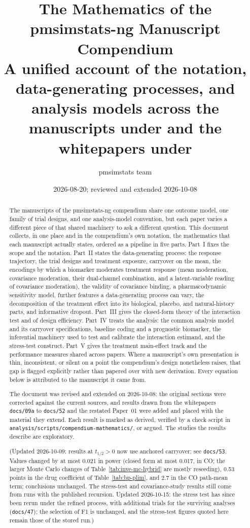 \documentclass[11pt]{article}
\title{\textbf{The Mathematics of the pmsimstats-ng Manuscript
Compendium}\\[0.3em]
\large A unified account of the notation, data-generating processes,
and analysis models across the manuscripts under
\code{analysis/report/} and the whitepapers under \code{docs/}}
\author{pmsimstats team}
\date{2026-08-20; reviewed and extended 2026-10-08}
\newcommand{\code}[1]{\texttt{#1}}
\begin{document}
\maketitle

\begin{abstract}
\noindent
The manuscripts of the pmsimstats-ng compendium share one
outcome model, one family of trial designs, and one analysis-model
convention, but each paper varies a different piece of that shared
machinery to ask a different question. This document collects, in one
place and in the compendium's own notation, the mathematics that each
manuscript actually states, ordered as a pipeline in five parts.
Part~I fixes the scope and the notation. Part~II states the
data-generating process: the response trajectory, the trial designs
and treatment exposure, carryover on the mean, the encodings by which
a biomarker moderates treatment response (mean moderation, covariance
moderation, their dual-channel combination, and a latent-variable
reading of covariance moderation), the validity of covariance binding,
a pharmacodynamic sensitivity model, further features a
data-generating process can vary, the decomposition of the treatment
effect into its biological, placebo, and natural-history parts, and
informative dropout. Part~III gives the closed-form theory of the
interaction test and of design efficiency. Part~IV treats the
analysis: the common analysis model and its carryover specifications,
baseline coding and a prognostic biomarker, the inferential machinery
used to test and calibrate the interaction estimand, and the
stress-test construct. Part~V gives the treatment main-effect track
and the performance measures shared across papers. Where a
manuscript's own presentation is thin, inconsistent, or silent on a
point the compendium's design nonetheless raises, that gap is flagged
explicitly rather than papered over with new derivation. Every
equation below is attributed to the manuscript it came from.

The document was revised and extended on 2026-10-08: the original
sections were corrected against the current sources, and results drawn
from the whitepapers \code{docs/09a} to \code{docs/52} and the restated
Paper~01 were added and placed with the material they extend. Each
result is marked as derived, verified by a check script in
\code{analysis/scripts/compendium-mathematics/}, or argued. The studies
the results describe are exploratory.

(Updated 2026-10-09: results at $t_{1/2} > 0$ now use anchored
carryover; see \code{docs/53}. Values changed by at most 0.021 in power
(closed form at most 0.017, in CO; the larger Monte Carlo changes of
Table~\ref{tab:inve-mc-hybrid} are mostly reseeding), 0.53 points in
the drug coefficient of Table~\ref{tab:bp-plim}, and 2.7 in the CO
path-mean term; conclusions unchanged. The stress-test and
covariance-study results still come from runs with the published
recursion. Updated 2026-10-15: the stress test has since been rerun
under the refined process, with additional trials for the surviving
analyses (\code{docs/47}); the selection of F1 is unchanged, and the
stress-test figures quoted here remain those of the stored run.)
\end{abstract}
\end{document}
